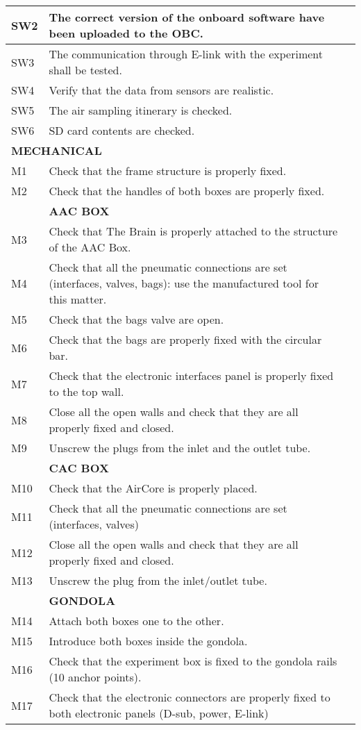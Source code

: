 \begin{longtable} {|m{}|m{}|m{}|}
SW2 & The correct version of the onboard software have been uploaded to the OBC. & \\ \hline
SW3 & The communication through E-link with the experiment shall be tested. & \\ \hline
SW4 & Verify that the data from sensors are  realistic. & \\ \hline
SW5 & The air sampling itinerary is checked. & \\ \hline
SW6 & SD card contents are checked. & \\ \hline
\multicolumn{2}{|l|}{ \textbf{MECHANICAL} } & \\
\hline
M1 & Check that the frame structure is properly fixed. & \\
\hline
M2 & Check that the handles of both boxes are properly fixed. & \\
\hline
& \textbf{AAC BOX} & \\
\hline
M3 & Check that The Brain is properly attached to the structure of the AAC Box. & \\
\hline
M4 & Check that all the pneumatic connections are set (interfaces, valves, bags): use the manufactured tool for this matter. & \\
\hline
M5 & Check that the bags valve are open. & \\
\hline
M6 & Check that the bags are properly fixed with the circular bar. & \\
\hline
M7 & Check that the electronic interfaces panel is properly fixed to the top wall. & \\
\hline
M8 & Close all the open walls and check that they are all properly fixed and closed. & \\
\hline
M9 & Unscrew the plugs from the inlet and the outlet tube. & \\
\hline
& \textbf{CAC BOX} & \\
\hline
M10 & Check that the AirCore is properly placed. & \\
\hline
M11 & Check that all the pneumatic connections are set (interfaces, valves) & \\
\hline
M12 & Close all the open walls and check that they are all properly fixed and closed. & \\
\hline
M13 & Unscrew the plug from the inlet/outlet tube. & \\
\hline
& \textbf{GONDOLA} & \\
\hline
M14 &  Attach both boxes one to the other. & \\
\hline
M15 & Introduce both boxes inside the gondola. & \\
\hline
M16 & Check that the experiment box is fixed to the gondola rails (10 anchor points). & \\
\hline
M17 & Check that the electronic connectors are properly fixed to both electronic panels (D-sub, power, E-link) & \\
\hline


\end{longtable}
